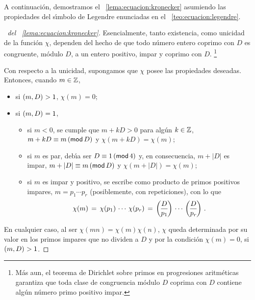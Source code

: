 A continuaci\'on, demostramos el \lemaname~\ref{lema:ecuacion:kronecker}
asumiendo las propiedades del s\'{\i}mbolo de Legendre enunciadas en el
\teoname~\ref{teo:ecuacion:legendre}.

\begin{proof}[\proofname~del \lemaname~\ref{lema:ecuacion:kronecker}]
	Esencialmente, tanto existencia, como unicidad de la funci\'on $\chi$,
	dependen del hecho de que todo n\'umero entero coprimo con $D$
	es congruente, m\'odulo $D$, a un entero positivo, impar y coprimo
	con $D$.%
	\footnote{
		M\'as aun, el teorema de Dirichlet sobre primos en
		progresiones aritm\'eticas garantiza que toda clase de
		congruencia m\'odulo $D$ coprima con $D$ contiene alg\'un
		n\'umero primo positivo impar.
	}

	Con respecto a la unicidad, supongamos que $\chi$ posee las
	propiedades deseadas. Entonces, cuando $m\in\Enteros$,
	\begin{itemize}
		\item si $\mcd{m,D}>1$, $\chi(m)=0$;
		\item si $\mcd{m,D}=1$,
			\begin{itemize}
				\item si $m<0$, se cumple que $m+kD>0$
					para alg\'un $k\in\Enteros$,
					$m+kD\equiv m\tmodulo[D]$ y
					$\chi(m+kD)=\chi(m)$;
				\item si $m$ es par, deb\'{\i}a ser
					$D\equiv 1\tmodulo[4]$ y, en
					consecuencia, $m+|D|$ es impar,
					$m+|D|\equiv m\tmodulo[D]$ y
					$\chi(m+|D|)=\chi(m)$;
				\item si $m$ es impar y positivo, se escribe
					como producto de primos positivos
					impares, $m=p_1\cdots p_r$
					(posiblemente, con repeticiones), con
					lo que
					\begin{displaymath}
						\chi(m)\,=\,\chi(p_1)\,\cdots\,
							\chi(p_r)\,=\,
							\legendre D{p_1}\,
							\cdots\,
							\legendre D{p_r}
						\text{ .}
					\end{displaymath}
			\end{itemize}
	\end{itemize}
	En cualquier caso, al ser $\chi(mn)=\chi(m)\chi(n)$, $\chi$ queda
	determinada por su valor en los primos impares que no dividen a $D$
	y por la condici\'on $\chi(m)=0$, si $\mcd{m,D}>1$.


\end{proof}
